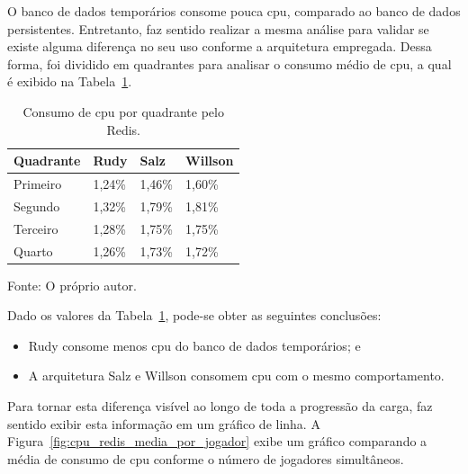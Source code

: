 O banco de dados temporários consome pouca \ac{cpu}, comparado ao banco de dados persistentes.
%
Entretanto, faz sentido realizar a mesma análise para validar se existe alguma diferença no seu uso conforme a arquitetura empregada.
%
Dessa forma, foi dividido em quadrantes para analisar o consumo médio de \ac{cpu}, a qual é exibido na Tabela~\ref{tab:cpu_redis_media_quadrantes}.

\begin{table}[htb!]
\centering
\begin{adjustbox}{max width=\textwidth}
\caption{Consumo de \ac{cpu} por quadrante pelo Redis.}
\label{tab:cpu_redis_media_quadrantes}
\begin{tabular}{|l|l|l|l|}

\hline

Quadrante & Rudy    & Salz    & Willson \\ \hline

Primeiro  & 1,24\% & 1,46\% & 1,60\% \\ \hline

Segundo   & 1,32\% & 1,79\% & 1,81\% \\ \hline

Terceiro  & 1,28\% & 1,75\% & 1,75\% \\ \hline

Quarto    & 1,26\% & 1,73\% & 1,72\% \\ \hline

\end{tabular}

\end{adjustbox}

Fonte: O próprio autor.
\end{table}

Dado os valores da Tabela~\ref{tab:cpu_redis_media_quadrantes}, pode-se obter as seguintes conclusões:

\begin{itemize}
 \item Rudy consome menos \ac{cpu} do banco de dados temporários; e
 \item A arquitetura Salz e Willson consomem \ac{cpu} com o mesmo comportamento.
\end{itemize}

Para tornar esta diferença visível ao longo de toda a progressão da carga, faz sentido exibir esta informação em um gráfico de linha.
%
A Figura~\ref{fig:cpu_redis_media_por_jogador} exibe um gráfico comparando a média de consumo de \ac{cpu} conforme o número de jogadores simultâneos.

